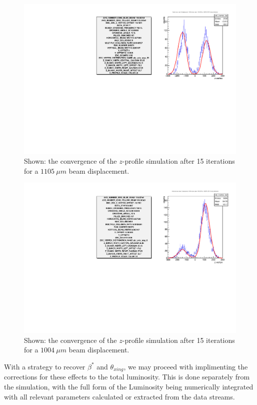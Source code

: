 \begin{figure}
  \centering
  \includegraphics[width=\textwidth]{./figures/1105_micron_step.pdf}
  \caption{
    Shown: the convergence of the $z$-profile simulation after 15 iterations for
    a $1105~\mu m$ beam displacement. 
  }
  \label{fig:profile_3}
\end{figure}

\begin{figure}
  \centering
  \includegraphics[width=\textwidth]{./figures/more_statistics.pdf}
  \caption{
    Shown: the convergence of the $z$-profile simulation after 15 iterations for
    a $1004~\mu m$ beam displacement. 
  }
  \label{fig:profile_4}
\end{figure}

With a strategy to recover $\beta^*$ and $\theta_{xing}$, we may proceed with
implimenting the corrections for these effects to the total luminosity. This is
done separately from the simulation, with the full form of the Luminosity being
numerically integrated with all relevant parameters calculated or extracted from
the data streams.

